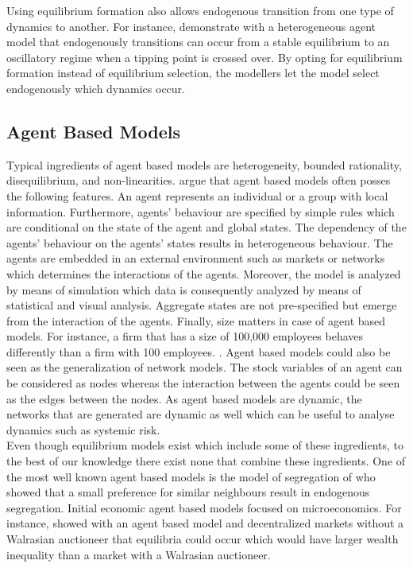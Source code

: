 Using equilibrium formation also allows endogenous transition from one type of dynamics to another. For instance, \cite{asano_emergent_2021} demonstrate with a heterogeneous agent model that endogenously transitions can occur from a stable equilibrium to an oscillatory regime when a tipping point is crossed over. By opting for equilibrium formation instead of equilibrium selection, the modellers let the model select endogenously which dynamics occur.
\subsection{Agent Based Models}
Typical ingredients of agent based models are heterogeneity, bounded rationality, disequilibrium, and non-linearities. \cite{axtell_agent-based_nodate} argue that agent based models often posses the following features. An agent represents an individual or a group with local information. Furthermore, agents' behaviour are specified by simple rules which are conditional on the state of the agent and global states. The dependency of the agents' behaviour on the agents' states results in heterogeneous behaviour. The agents are embedded in an external environment such as markets or networks which determines the interactions of the agents. Moreover, the model is analyzed by means of simulation which data is consequently analyzed by means of statistical and visual analysis. Aggregate states are not pre-specified but emerge from the interaction of the agents. Finally, size matters in case of agent based models. For instance, a firm that has a size of 100,000 employees behaves differently than a firm with  100 employees. \citep{axtell_agent-based_nodate}. Agent based models could also be seen as the generalization of network models. The stock variables of an agent can be considered as nodes whereas the interaction between the agents could be seen as the edges between the nodes. As agent based models are dynamic, the networks that are generated are dynamic as well which can be useful to analyse dynamics such as systemic risk.\\

Even though equilibrium models exist which include some of these ingredients, to the best of our knowledge there exist none that combine these ingredients. One of the most well known agent based models is the model of segregation of \cite{schelling_models_1969} who showed that a small preference for similar neighbours result in endogenous segregation. Initial economic agent based models focused on microeconomics. For instance, \cite{albin_decentralized_1992} showed with an agent based model and decentralized markets without a Walrasian auctioneer that equilibria could occur which would have larger wealth inequality than a market with a Walrasian auctioneer. \\



